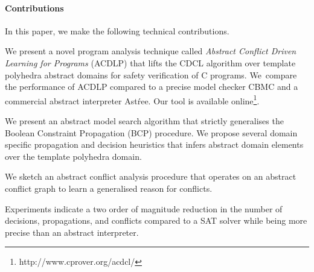 \paragraph{Contributions}
In this paper, we make the following technical contributions.
%
\begin{compactenum}
\item We present a novel program analysis technique called {\em Abstract 
Conflict Driven Learning for Programs} (ACDLP) that lifts the CDCL algorithm 
over template polyhedra abstract domains for safety verification of C programs.  
We~compare the performance of ACDLP compared to a precise model checker CBMC and a 
commercial abstract interpreter Ast{\'r}ee.  Our tool is available 
online\footnote{http://www.cprover.org/acdcl/}. 

\item We present an abstract model search algorithm that strictly 
generalises the Boolean Constraint Propagation (BCP) procedure. We 
propose several domain specific propagation and decision heuristics 
that infers abstract domain elements over the template polyhedra domain.   
\item We sketch an abstract conflict analysis procedure that operates on an 
abstract conflict graph to learn a generalised reason for conflicts.  
 
\item  Experiments indicate a two order of magnitude reduction 
in the number of decisions, propagations, and conflicts compared 
to a SAT solver while being more precise than an abstract interpreter.  
\end{compactenum}

